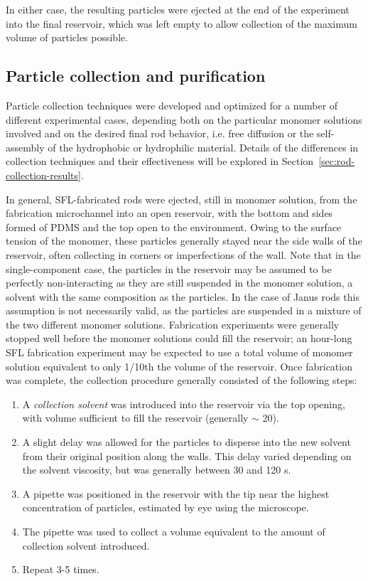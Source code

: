 In either case, the resulting particles were ejected at the end of the experiment into the final reservoir, which
was left empty to allow collection of the maximum volume of particles possible.

\subsection{Particle collection and purification}

Particle collection techniques were developed and optimized for a number of different experimental cases,
depending both on the particular monomer solutions involved and on the desired final rod behavior, i.e. 
free diffusion or the self-assembly of the hydrophobic or hydrophilic material.  Details of the differences
in collection techniques and their effectiveness will be explored in Section~\ref{sec:rod-collection-results}.

In general, SFL-fabricated rods were ejected, still in monomer solution, from the fabrication microchannel into 
an open reservoir, with the bottom and sides formed of PDMS and the top open to the environment.  Owing to the
surface tension of the monomer, these particles generally stayed near the side walls of the reservoir, often
collecting in corners or imperfections of the wall.  Note that in the single-component case, the particles in
the reservoir may be assumed to be perfectly non-interacting as they are still suspended in the monomer solution, 
a solvent with the
same composition as the particles.   In the case of Janus rods this assumption is not necessarily valid, as
the particles are suspended in a mixture of the two different monomer solutions.  Fabrication experiments were
generally stopped well before the monomer solutions could fill the reservoir; an hour-long SFL fabrication experiment
may be expected to use a total volume of monomer solution equivalent to only 1/10th the volume of the
reservoir.  Once fabrication 
was complete, the collection procedure generally consisted of the following steps:

\begin{enumerate}
\item A \textit{collection solvent} was introduced into the reservoir via the top opening, with volume sufficient to
fill the reservoir (generally $\sim$ 20\uL).
\item A slight delay was allowed for the particles to disperse into the new solvent from their 
original position along the 
walls. This delay varied depending on the solvent viscosity, but was generally between 30 and 120 s.
\item A pipette was positioned in the reservoir with the tip near the highest concentration of particles, estimated
by eye using the microscope.
\item The pipette was used to collect a volume equivalent to the amount of collection solvent introduced.
\item Repeat 3-5 times.
\end{enumerate}

